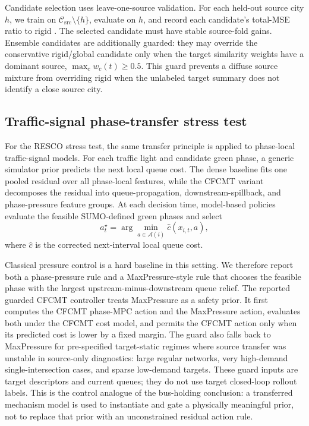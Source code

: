 Candidate selection uses leave-one-source validation.
For each held-out source city $h$, we train on $\mathcal{C}_{\mathrm{src}}\setminus\{h\}$, evaluate on $h$, and record each candidate's total-MSE ratio to rigid \ours.
The selected candidate must have stable source-fold gains.
Ensemble candidates are additionally guarded: they may override the conservative rigid/global candidate only when the target similarity weights have a dominant source, $\max_c w_c(t)\ge 0.5$.
This guard prevents a diffuse source mixture from overriding rigid \ours when the unlabeled target summary does not identify a close source city.

\subsection{Traffic-signal phase-transfer stress test}

For the RESCO stress test, the same transfer principle is applied to phase-local traffic-signal models.
For each traffic light and candidate green phase, a generic simulator prior predicts the next local queue cost.
The dense baseline fits one pooled residual over all phase-local features, while the CFCMT variant decomposes the residual into queue-propagation, downstream-spillback, and phase-pressure feature groups.
At each decision time, model-based policies evaluate the feasible SUMO-defined green phases and select
\[
    a^\star_t
    =
    \arg\min_{a\in\mathcal{A}(i)}
    \hat c(x_{i,t},a),
\]
where $\hat c$ is the corrected next-interval local queue cost.

Classical pressure control is a hard baseline in this setting.
We therefore report both a phase-pressure rule and a MaxPressure-style rule that chooses the feasible phase with the largest upstream-minus-downstream queue relief.
The reported guarded CFCMT controller treats MaxPressure as a safety prior.
It first computes the CFCMT phase-MPC action and the MaxPressure action, evaluates both under the CFCMT cost model, and permits the CFCMT action only when its predicted cost is lower by a fixed margin.
The guard also falls back to MaxPressure for pre-specified target-static regimes where source transfer was unstable in source-only diagnostics: large regular networks, very high-demand single-intersection cases, and sparse low-demand targets.
These guard inputs are target descriptors and current queues; they do not use target closed-loop rollout labels.
This is the control analogue of the bus-holding conclusion: a transferred mechanism model is used to instantiate and gate a physically meaningful prior, not to replace that prior with an unconstrained residual action rule.

